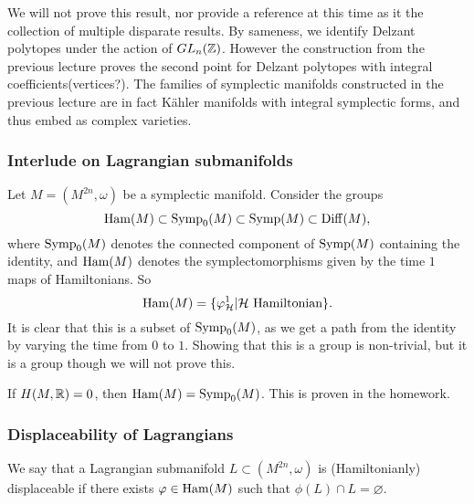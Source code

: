 \begin{remark}
	We will not prove this result, nor provide a reference at this time as it the collection of multiple disparate results.
	By sameness, we identify Delzant polytopes under the action of $GL_n(\mathbb{Z})$.
	However the construction from the previous lecture proves the second point for Delzant polytopes with integral coefficients(vertices?).
	The families of symplectic manifolds constructed in the previous lecture are in fact Kähler manifolds with integral symplectic forms, and thus embed as complex varieties.
\end{remark}

\subsubsection*{Interlude on Lagrangian submanifolds}
Let $M=(M^{2n},\omega)$ be a symplectic manifold.
Consider the groups
\[\operatorname{Ham}(M)\subset\operatorname{Symp}_0(M)\subset\operatorname{Symp}(M)\subset\operatorname{Diff}(M),\]
where $\operatorname{Symp}_0(M)$ denotes the connected component of $\operatorname{Symp}(M)$ containing the identity, and $\operatorname{Ham}(M)$ denotes the symplectomorphisms given by the time $1$ maps of Hamiltonians.
So
\[\operatorname{Ham}(M)=\{\varphi_{\mathcal{H}}^1|\mathcal{H}\text{ Hamiltonian}\}.\]
It is clear that this is a subset of $\operatorname{Symp}_0(M)$, as we get a path from the identity by varying the time from $0$ to $1$.
Showing that this is a group is non-trivial, but it is a group though we will not prove this.

\begin{remark}
	If $H(M,\mathbb{R})=0$, then $\operatorname{Ham}(M)=\operatorname{Symp}_0(M)$.
	This is proven in the homework.
\end{remark}


\subsubsection*{Displaceability of Lagrangians}

\begin{dfn}
	We say that a Lagrangian submanifold $L\subset(M^{2n},\omega)$ is (Hamiltonianly) displaceable if there exists $\varphi\in\operatorname{Ham}(M)$ such that $\phi(L)\cap L=\varnothing$.
\end{dfn}

\begin{example}
\end{example}

